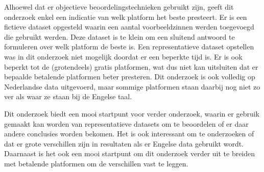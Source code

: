 Alhoewel dat er objectieve beoordelingstechnieken gebruikt zijn, geeft dit onderzoek enkel een indicatie van welk platform het beste presteert. Er is een fictieve dataset opgesteld waarin een aantal voorbeeldzinnen werden toegevoegd die gebruikt werden. Deze dataset is te klein om een sluitend antwoord te formuleren over welk platform de beste is. Een representatieve dataset opstellen was in dit onderzoek niet mogelijk doordat er een beperkte tijd is. Er is ook beperkt tot de (grotendeels) gratis platformen, wat dus niet kan uitsluiten dat er bepaalde betalende platformen beter presteren. Dit onderzoek is ook volledig op Nederlandse data uitgevoerd, maar sommige platformen staan daarbij nog niet zo ver als waar ze staan bij de Engelse taal.

Dit onderzoek biedt een mooi startpunt voor verder onderzoek, waarin er gebruik gemaakt kan worden van representatieve datasets om te beoordelen of er daar andere conclusies worden bekomen. Het is ook interessant om te onderzoeken of dat er grote verschillen zijn in resultaten als er Engelse data gebruikt wordt. Daarnaast is het ook een mooi startpunt om dit onderzoek verder uit te breiden met betalende platformen om de verschillen vast te leggen.


